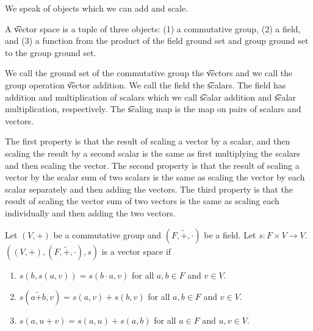 
\sbasic
























\sstart
{}


We speak of objects which we can add and scale.


A \t{vector space} is a tuple of three objects:
(1) a commutative group, (2) a field, and (3) a function from the product of the field ground set and group ground set to the group ground set.

We call the ground set of the commutative group the \t{vectors} and we call the group operation \t{vector addition}.
We call the field the \t{scalars}.
The field has addition and multiplication of scalars which we call \t{scalar addition} and \t{scalar multiplication}, respectively.
The \t{scaling map} is the map on pairs of scalars and vectors.

The first property is that the result of scaling a vector by a scalar, and then scaling the result by a second scalar is the same as first multiplying the scalars and then scaling the vector.
The second property is that the result of scaling a vector by the scalar sum of two scalars is the same as scaling the vector by each scalar separately and then adding the vectors.
The third property is that the result of scaling the vector sum of two vectors is the same as scaling each individually and then adding the two vectors.


Let $(V,+)$ be a commutative group and $(F, \tilde{+}, \cdot)$ be a field.
Let $s: F \times V \to V$.  $((V, +), (F, \tilde{+}, \cdot), s)$ is a vector space if
\begin{enumerate}
  \item $s(b,s(a, v)) = s(b \cdot a, v)$ for all $a, b \in F$ and $v \in V$.
  \item $s(a\tilde{+}b, v) = s(a, v) + s(b, v)$ for all $a, b \in F$ and $v \in V$.
  \item $s(a, u + v) = s(a,u) + s(a, b)$ for all $a \in F$ and $u, v \in V$.
\end{enumerate}

